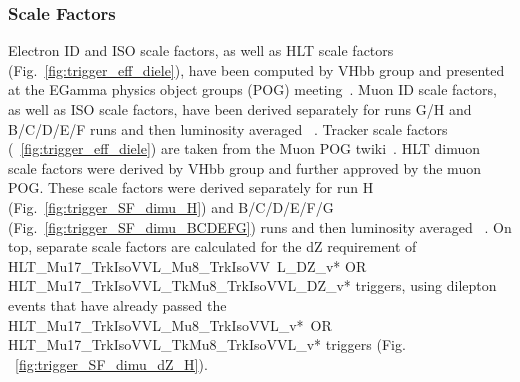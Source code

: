 


\subsubsection{Scale Factors}

Electron ID and ISO scale factors, as well as HLT scale factors (Fig.~\ref{fig:trigger_eff_diele}), have been computed by VHbb group and presented at the EGamma physics object groups (POG) meeting~\cite{egSF}.
Muon ID scale factors, as well as ISO scale factors, have been derived separately for runs G/H and B/C/D/E/F runs and then luminosity averaged ~\cite{muonIDnISO}. Tracker scale factors (~\ref{fig:trigger_eff_diele}) are taken from the Muon POG twiki~\cite{muonTRK}. HLT dimuon scale factors were derived by VHbb group and further approved by the muon POG. These scale factors were derived separately for run H (Fig.~\ref{fig:trigger_SF_dimu_H}) and B/C/D/E/F/G (Fig.~\ref{fig:trigger_SF_dimu_BCDEFG}) runs and then luminosity averaged ~\cite{muonTrigger}. On top, separate scale factors are calculated for the dZ requirement of HLT\_Mu17\_TrkIsoVVL\_Mu8\_TrkIsoVV\
L\_DZ\_v* OR HLT\_Mu17\_TrkIsoVVL\_TkMu8\_TrkIsoVVL\_DZ\_v* triggers, using dilepton events that have already passed the HLT\_Mu17\_TrkIsoVVL\_Mu8\_TrkIsoVVL\_v*\
 OR HLT\_Mu17\_TrkIsoVVL\_TkMu8\_TrkIsoVVL\_v* triggers (Fig. ~\ref{fig:trigger_SF_dimu_dZ_H}).

